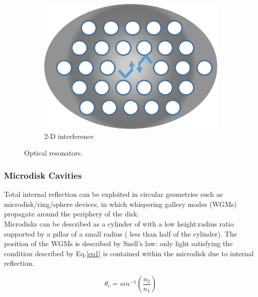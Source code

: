 \begin{figure}
\begin{subfigure}[b]{0.3\textwidth}
	\end{subfigure}%
	\hspace*{0.5cm}
	\begin{subfigure}[b]{0.3\textwidth}
		\centering
		\includegraphics[width=.85\linewidth]{Figs/Ch1/pcc}
		\caption{2-D interference}
	\end{subfigure}%
	
	\caption{Optical resonators.}
	\label{1.13}
\end{figure}

\FloatBarrier

\subsubsection{Microdisk Cavities}
\label{microdisk section}
Total internal reflection can be exploited in circular geometries such as microdisk/ring/sphere devices, in which whispering gallery modes  (WGMs) propagate around the periphery of the disk.\\
Microdisks can be described as a cylinder of with a low height:radius ratio supported by a pillar of a small radius ( less than half of the cylinder). The position of the WGMs is described by Snell's law: only light satisfying the condition described by Eq.\ref{eq1} is contained within the microdisk due to internal reflection.

\begin{equation} \label{eq1}
\theta_{c}=sin^{-1}(\frac{n_{2}}{n_{1}})
\end{equation}

